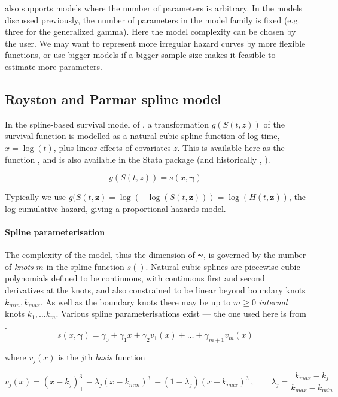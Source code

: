 \documentclass[nojss,nofooter]{jss}
\begin{document}
 also supports models where the number of parameters is
arbitrary.  In the models discussed previously, the number of
parameters in the model family is fixed (e.g. three for the
generalized gamma).  Here the model complexity can be chosen by the
user.  We may want to represent more irregular hazard
curves by more flexible functions, or use bigger models if a bigger
sample size makes it feasible to estimate more parameters.


\subsection{Royston and Parmar spline model}

In the spline-based survival model of \citet{royston:parmar}, a
transformation $g(S(t,z))$ of the survival function is modelled as a
natural cubic spline function of log time, $x = \log(t)$, plus linear
effects of covariates $z$.  This is available here as the function
,  and is also available in the Stata package
 \citep{stpm2} (and historically , \citet{stpm:orig,stpm:update}).

  \[g(S(t,z)) = s(x, \bm{\gamma})\]

Typically we use $g(S(t,\mathbf{z}) = \log(-\log(S(t,\mathbf{z}))) =
\log(H(t,\mathbf{z}))$, the log cumulative hazard, giving a
proportional hazards model.    

\paragraph{Spline parameterisation}
The complexity of the model, thus the dimension of $\bm{\gamma}$, is
governed by the number of \emph{knots} $m$ in the spline function
$s()$.  Natural cubic splines are piecewise cubic polynomials defined
to be continuous, with continuous first and second derivatives at the
knots, and also constrained to be linear beyond boundary knots
$k_{min},k_{max}$.  As well as the boundary knots there may be up to
$m\geq 0$ \emph{internal} knots $k_1,\ldots k_m$.  Various spline
parameterisations exist --- the one used here is from
\citet{royston:parmar}.
\begin{equation}
  \label{eq:spline}
  s(x,\bm{\gamma}) = \gamma_0 + \gamma_1 x + \gamma_2 v_1(x) + \ldots + \gamma_{m+1} v_m(x)   
\end{equation}


where $v_j(x)$ is the $j$th \emph{basis} function

\[v_j(x) = (x - k_j)^3_+ - \lambda_j(x - k_{min})^3_+ - (1 - \lambda_j) (x - k_{max})^3_+, 
\qquad
\lambda_j = \frac{k_{max} - k_j}{k_{max} - k_{min}} \] 
\end{document}
